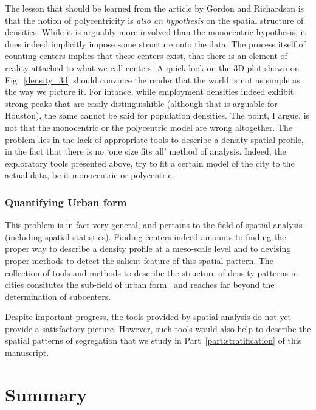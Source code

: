 The lesson that should be learned from the article by Gordon and Richardson is
that the notion of polycentricity is \emph{also an hypothesis} on the spatial
structure of densities. While it is arguably more involved than the monocentric
hypothesis, it does indeed implicitly impose some structure onto the data. The
process itself of counting centers implies that these centers exist, that there
is an element of reality attached to what we call centers. A quick look on the
3D plot shown on Fig.~\ref{density_3d} should convince the reader that the world
is not as simple as the way we picture it. For intance, while employment
densities indeed exhibit strong peaks that are easily distinguishible (although
that is arguable for Houston), the same cannot be said for population densities.
The point, I argue, is not that the monocentric or the polycentric model are
wrong altogether. The problem lies in the lack of appropriate tools to describe
a density spatial profile, in the fact that there is no `one size fits all'
method of analysis. Indeed, the exploratory tools presented above, try to fit a
certain model of the city to the actual data, be it monocentric or
polycentric.

\subsubsection{Quantifying Urban form}
\label{sub:urban_form}

This problem is in fact very general, and pertains to the field of spatial
analysis (including spatial statistics). Finding centers indeed amounts to
finding the proper way to describe a density profile at a meso-scale level and
to devising proper methods to detect the salient feature of this spatial
pattern. The collection of tools and methods to describe the structure
of density patterns in cities consitutes the sub-field of urban
form~\cite{Tsai:2005,Schwarz:2010,LeNechet:2015} and reaches far beyond the
determination of subcenters.

Despite important progress, the tools provided by spatial analysis do not yet
provide a satisfactory picture. However, such tools would also help to describe
the spatial patterns of segregation that we study in
Part~\ref{part:stratification} of this manuscript.

\section{Summary}
\label{sec:summary}

